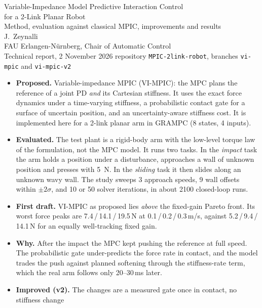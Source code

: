 \documentclass[11pt,a4paper]{article}
\begin{document}
\begin{center}
{\LARGE Variable-Impedance Model Predictive Interaction Control\\[2pt] for a 2-Link Planar Robot}\\[8pt]
{\large Method, evaluation against classical MPIC, improvements and results}\\[12pt]
J.~Zeynalli\\[2pt]
{\small FAU Erlangen-N\"urnberg, Chair of Automatic Control}\\[2pt]
{\small Technical report, 2 November 2026 \;\textbullet\; repository \texttt{MPIC-2link-robot}, branches \texttt{vi-mpic} and \texttt{vi-mpic-v2}}
\end{center}

\begin{tcolorbox}[summarybox,title=Summary]
\begin{itemize}[leftmargin=12pt]
\item \textbf{Proposed.} Variable-impedance MPIC (VI-MPIC): the MPC plans the reference of a joint PD
  \emph{and} its Cartesian stiffness. It uses the exact force dynamics under a time-varying stiffness, a
  probabilistic contact gate for a surface of uncertain position, and an uncertainty-aware stiffness
  cost. It is implemented here for a 2-link planar arm in GRAMPC (8 states, 4 inputs).
\item \textbf{Evaluated.} The test plant is a rigid-body arm with the low-level torque law of the
  formulation, not the MPC model. It runs two tasks. In the \emph{impact} task the arm holds a position
  under a disturbance, approaches a wall of unknown position and presses with \SI{5}{N}. In the
  \emph{sliding} task it then slides along an unknown wavy wall. The study sweeps 3 approach speeds, 9
  wall offsets within $\pm2\sigma$, and 10 or 50 solver iterations, in about 2100 closed-loop runs.
\item \textbf{First draft.} VI-MPIC as proposed lies \emph{above} the fixed-gain Pareto front. Its worst
  force peaks are 7.4\,/\,14.1\,/\,19.5\,N at 0.1\,/\,0.2\,/\,0.3\,m/s, against 5.2\,/\,9.4\,/\,14.1\,N
  for an equally well-tracking fixed gain.
\item \textbf{Why.} After the impact the MPC kept pushing the reference at full speed. The
  probabilistic gate under-predicts the force rate in contact, and the model trades the push against
  planned softening through the stiffness-rate term, which the real arm follows only 20--30\,ms later.
\item \textbf{Improved (v2).} The changes are a measured gate once in contact, no stiffness change

\end{itemize}
\end{tcolorbox}
\end{document}
